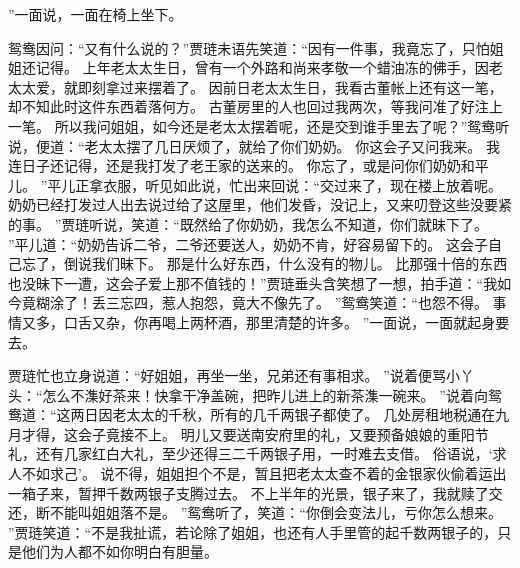 ”一面说，一面在椅上坐下。
\par
鸳鸯因问：“又有什么说的？”贾琏未语先笑道：“因有一件事，我竟忘了，只怕姐姐还记得。
上年老太太生日，曾有一个外路和尚来孝敬一个蜡油冻的佛手，因老太太爱，就即刻拿过来摆着了。
因前日老太太生日，我看古董帐上还有这一笔，却不知此时这件东西着落何方。
古董房里的人也回过我两次，等我问准了好注上一笔。
所以我问姐姐，如今还是老太太摆着呢，还是交到谁手里去了呢？”鸳鸯听说，便道：“老太太摆了几日厌烦了，就给了你们奶奶。
你这会子又问我来。
我连日子还记得，还是我打发了老王家的送来的。
你忘了，或是问你们奶奶和平儿。
”平儿正拿衣服，听见如此说，忙出来回说：“交过来了，现在楼上放着呢。
奶奶已经打发过人出去说过给了这屋里，他们发昏，没记上，又来叨登这些没要紧的事。
”贾琏听说，笑道：“既然给了你奶奶，我怎么不知道，你们就昧下了。
”平儿道：“奶奶告诉二爷，二爷还要送人，奶奶不肯，好容易留下的。
这会子自己忘了，倒说我们昧下。
那是什么好东西，什么没有的物儿。
比那强十倍的东西也没昧下一遭，这会子爱上那不值钱的！”贾琏垂头含笑想了一想，拍手道：“我如今竟糊涂了！丢三忘四，惹人抱怨，竟大不像先了。
”鸳鸯笑道：“也怨不得。
事情又多，口舌又杂，你再喝上两杯酒，那里清楚的许多。
”一面说，一面就起身要去。
\par
贾琏忙也立身说道：“好姐姐，再坐一坐，兄弟还有事相求。
”说着便骂小丫头：“怎么不潗好茶来！快拿干净盖碗，把昨儿进上的新茶潗一碗来。
”说着向鸳鸯道：“这两日因老太太的千秋，所有的几千两银子都使了。
几处房租地税通在九月才得，这会子竟接不上。
明儿又要送南安府里的礼，又要预备娘娘的重阳节礼，还有几家红白大礼，至少还得三二千两银子用，一时难去支借。
俗语说，‘求人不如求己’。
说不得，姐姐担个不是，暂且把老太太查不着的金银家伙偷着运出一箱子来，暂押千数两银子支腾过去。
不上半年的光景，银子来了，我就赎了交还，断不能叫姐姐落不是。
”鸳鸯听了，笑道：“你倒会变法儿，亏你怎么想来。
”贾琏笑道：“不是我扯谎，若论除了姐姐，也还有人手里管的起千数两银子的，只是他们为人都不如你明白有胆量。
